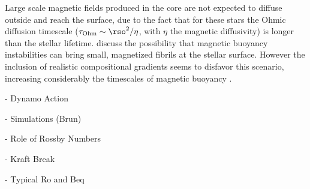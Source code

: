Large scale magnetic fields produced in the core are not expected to diffuse outside and reach the surface, due to the fact that for these stars the Ohmic diffusion timescale ($\tau_{\rm Ohm}\sim \rso^2/\eta$, with $\eta$ the magnetic diffusivity) is longer than the stellar lifetime. \citet{MacGregor_2003} discuss the possibility that magnetic buoyancy instabilities can bring small, magnetized fibrils at the stellar surface. However the inclusion of realistic compositional gradients seems to disfavor this scenario, increasing considerably the timescales of magnetic buoyancy \citep{MacDonald_2004}.  




- Dynamo Action

- Simulations (Brun)

- Role of Rossby Numbers

- Kraft Break
  
- Typical Ro and Beq   
 
  
  
  
  
  
  